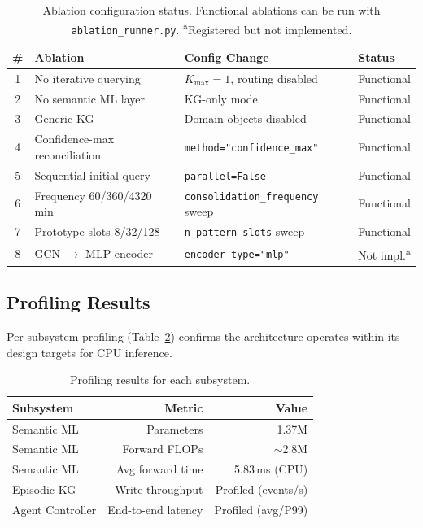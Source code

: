 \documentclass{article}
\begin{document}
\begin{table}[h]
\centering
\caption{Ablation configuration status. Functional ablations can be run with
\texttt{ablation\_runner.py}. \textsuperscript{a}Registered but not implemented.}
\label{tab:ablations}
\begin{tabular}{clll}
\toprule
\textbf{\#} & \textbf{Ablation} & \textbf{Config Change} & \textbf{Status} \\
\midrule
1 & No iterative querying & $K_{\max}=1$, routing disabled & Functional \\
2 & No semantic ML layer & KG-only mode & Functional \\
3 & Generic KG & Domain objects disabled & Functional \\
4 & Confidence-max reconciliation & \texttt{method="confidence\_max"} & Functional \\
5 & Sequential initial query & \texttt{parallel=False} & Functional \\
6 & Frequency 60/360/4320 min & \texttt{consolidation\_frequency} sweep & Functional \\
7 & Prototype slots 8/32/128 & \texttt{n\_pattern\_slots} sweep & Functional \\
8 & GCN $\to$ MLP encoder & \texttt{encoder\_type="mlp"} & Not impl.\textsuperscript{a} \\
\bottomrule
\end{tabular}
\end{table}

\subsection{Profiling Results}

Per-subsystem profiling (Table~\ref{tab:profile}) confirms the architecture
operates within its design targets for CPU inference.

\begin{table}[h]
\centering
\caption{Profiling results for each subsystem.}
\label{tab:profile}
\begin{tabular}{lrr}
\toprule
\textbf{Subsystem} & \textbf{Metric} & \textbf{Value} \\
\midrule
Semantic ML & Parameters & 1.37M \\
Semantic ML & Forward FLOPs & $\sim$2.8M \\
Semantic ML & Avg forward time & 5.83\,ms (CPU) \\
Episodic KG & Write throughput & Profiled (events/s) \\
Agent Controller & End-to-end latency & Profiled (avg/P99) \\
\bottomrule
\end{tabular}
\end{table}
\end{document}
